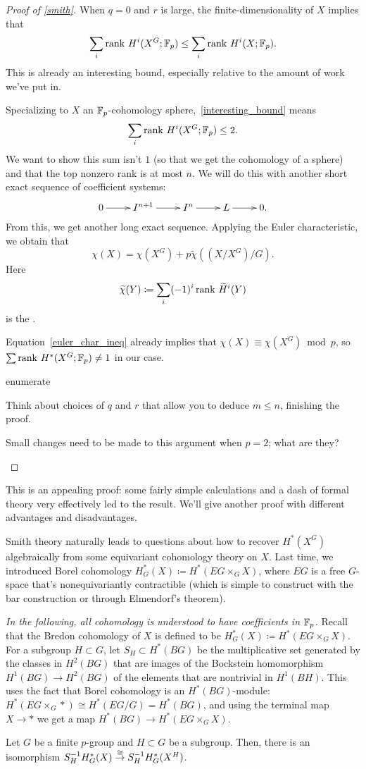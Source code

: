 \begin{proof}[Proof of \cref{smith}]
When $q = 0$ and $r$ is large, the finite-dimensionality of $X$ implies that
\begin{equation}
\label{interesting_bound}
\sum_i\operatorname{rank\,} H^i(X^G;\mathbb F_p) \le \sum_i \operatorname{rank\,} H^i(X;\mathbb F_p).
\end{equation}
This is already an interesting bound, especially relative to the amount of work we've put in.

Specializing to $X$ an $\mathbb F_p$-cohomology sphere,~\eqref{interesting_bound} means
\[\sum_i \operatorname{rank\,} H^i(X^G;\mathbb F_p) \le 2.\]
We want to show this sum isn't $1$ (so that we get the cohomology of a sphere) and that the top nonzero rank is at
most $n$. We will do this with another short exact sequence of coefficient systems:
\[\shortexact{I^{n+1}}{I^n}{L}.\]
From this, we get another long exact sequence. Applying the Euler characteristic, we obtain that
\begin{equation}
\label{euler_char_ineq}
\chi(X) = \chi(X^G) + p\widetilde\chi((X/X^G)/G).
\end{equation}
Here
\[\widetilde\chi(Y)\coloneqq \sum_i (-1)^i\operatorname{rank\,} \widetilde H^i(Y)\]
is the .

Equation~\eqref{euler_char_ineq} already implies that $\chi(X) \equiv \chi(X^G)\bmod p$, so $\sum\operatorname{rank\,}
H^*(X^G;\mathbb F_p)\ne 1$ in our case.
\begin{comp}{ex}{enumerate}
	\item Think about choices of $q$ and $r$ that allow you to deduce $m\le n$, finishing the proof.
	\item Small changes need to be made to this argument when $p = 2$; what are they?\qedhere
\end{comp}
\end{proof}
This is an appealing proof: some fairly simple calculations and a dash of formal theory very effectively led to the
result. We'll give another proof with different advantages and disadvantages.

Smith theory naturally leads to questions about how to recover $H^*(X^G)$ algebraically from some equivariant
cohomology theory on $X$. Last time, we introduced Borel cohomology $H_G^*(X) \coloneqq H^*(EG\times_G X)$, where
$EG$ is a free $G$-space that's nonequivariantly contractible (which is simple to construct with the bar
construction or through Elmendorf's theorem).

\emph{In the following, all cohomology is understood to have coefficients in $\mathbb F_p$.} Recall that the Bredon
cohomology of $X$ is defined to be $H_G^*(X)\coloneqq H^*(EG\times_G X)$. For a subgroup $H\subset G$, let
$S_H\subset H^*(BG)$ be the multiplicative set generated by the classes in $H^2(BG)$ that are images of the
Bockstein homomorphism $H^1(BG)\to H^2(BG)$ of the elements that are nontrivial in $H^1(BH)$. This uses the fact
that Borel cohomology is an $H^*(BG)$-module: $H^*(EG\times_G *) \cong H^*(EG/G) = H^*(BG)$, and using the terminal
map $X\to *$ we get a map $H^*(BG)\to H^*(EG\times_G X)$.
\begin{thm}
\label{localization}
Let $G$ be a finite $p$-group and $H\subset G$ be a subgroup. Then, there is an isomorphism
$S_H^{-1}H_G^*(X)\stackrel\cong\to S_H^{-1}H_G^*(X^H)$.
\end{thm}

